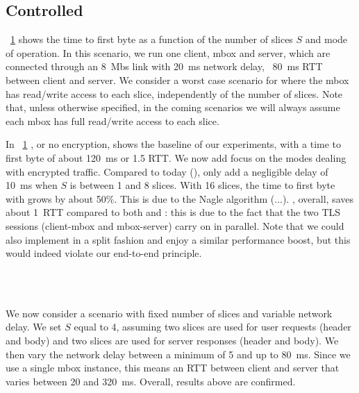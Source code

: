 \documentclass{article}
\begin{document}

\newpage
\subsection{Controlled}

\begin{figure}[t]
\centering
{}
\label{fig:eval_1}
\end{figure}

\fig~\ref{fig:eval_1} shows the time to first byte as a function of
the number of slices $S$ and mode of operation. In this scenario, we
run one client, mbox and server, which are connected through an 8~Mbs
link with 20~ms network delay, \ie~80~ms RTT between client and
server. We consider a worst case scenario for \sppt where the mbox
has read/write access to each slice, independently of the number of
slices. Note that, unless otherwise specified, in the coming scenarios
we will always assume each mbox has full read/write access to each
slice.

In \fig~\ref{fig:eval_1} \pln, or no encryption, shows the
baseline of our experiments, with a time to first byte of about 120~ms
or 1.5 RTT. We now add focus on the modes dealing with encrypted
traffic. Compared to today (\fwd), \sppt only add a negligible
delay of 10~ms when $S$ is between 1 and 8 slices. With 16 slices, the
time to first byte with \sppt grows by about 50\%. This is due to
the Nagle algorithm (...). \ssl, overall, saves about 1~RTT
compared to both \sppt and \pln: this is due to the fact that
the two TLS sessions (client-mbox and mbox-server) carry on in
parallel. Note that we could also implement \sppt in a split
fashion and enjoy a similar performance boost, but this would indeed
violate our end-to-end principle.


\\
\\


\newpage
\begin{figure}[!htbp]
\centering
{}
\label{fig:eval_2}
\end{figure}

We now consider a scenario with fixed number of slices and variable
network delay. We set $S$ equal to 4, assuming two slices are used for
user requests (header and body) and two slices are used for server
responses (header and body). We then vary the network delay between a
minimum of 5 and up to 80~ms. Since we use a single mbox instance,
this means an RTT between client and server that varies between 20 and
320~ms. Overall, results above are confirmed.
\end{document}
